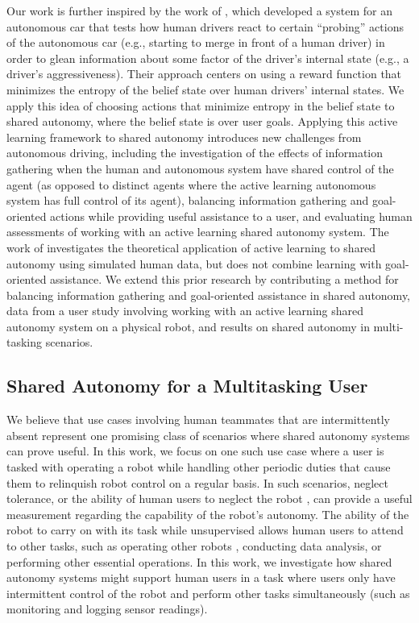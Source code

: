 \documentclass[conference]{IEEEtran}
\begin{document}
Our work is further inspired by the work of \citet{sadigh2016information}, which developed a system for an autonomous car that tests how human drivers react to certain ``probing'' actions of the autonomous car (e.g., starting to merge in front of a human driver) in order to glean information about some factor of the driver's internal state (e.g., a driver's aggressiveness). Their approach centers on using a reward function that minimizes the entropy of the belief state over human drivers' internal states. We apply this idea of choosing actions that minimize entropy in the belief state to shared autonomy, where the belief state is over user goals. Applying this active learning framework to shared autonomy introduces new challenges from autonomous driving, including the investigation of the effects of information gathering when the human and autonomous system have shared control of the agent (as opposed to distinct agents where the active learning autonomous system has full control of its agent), balancing information gathering and goal-oriented actions while providing useful assistance to a user, and evaluating human assessments of working with an active learning shared autonomy system. The work of \citet{landolfi2017exploring} investigates the theoretical application of active learning to shared autonomy using simulated human data, but does not combine learning with goal-oriented assistance. We extend this prior research by contributing a method for balancing information gathering and goal-oriented assistance in shared autonomy, data from a user study involving working with an active learning shared autonomy system on a physical robot, and results on shared autonomy in multi-tasking scenarios.

\subsection{Shared Autonomy for a Multitasking User}
We believe that use cases involving human teammates that are intermittently absent represent one promising class of scenarios where shared autonomy systems can prove useful. In this work, we focus on one such use case where a user is tasked with operating a robot while handling other periodic duties that cause them to relinquish robot control on a regular basis. In such scenarios, neglect tolerance, or the ability of human users to neglect the robot \cite{crandall2002characterizing, olsen2003metrics}, can provide a useful measurement regarding the capability of the robot's autonomy. The ability of the robot to carry on with its task while unsupervised allows human users to attend to other tasks, such as operating other robots \cite{crandall2005validating, cummings2008predicting}, conducting data analysis, or performing other essential operations. In this work, we investigate how shared autonomy systems might support human users in a task where users only have intermittent control of the robot and perform other tasks simultaneously (such as monitoring and logging sensor readings).
\end{document}
